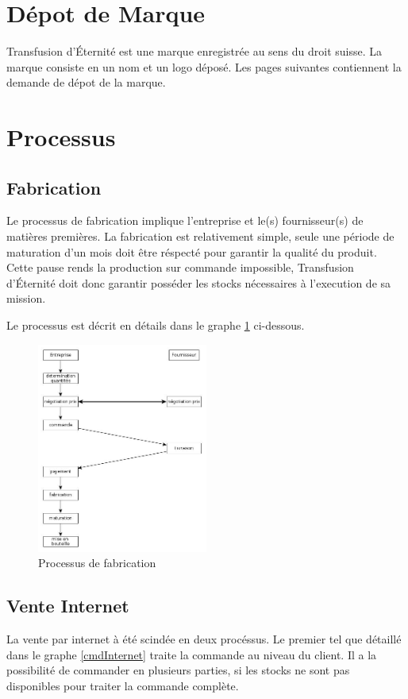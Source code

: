 \documentclass[10pt,a4paper]{article}
\newcommand{\tde}{Transfusion d'Éternité}
\begin{document}

\section{Dépot de Marque}
\tde{} est une marque enregistrée au sens du droit suisse.
La marque consiste en un nom et un logo déposé.
Les pages suivantes contiennent la demande de dépot de la marque.


\section{Processus}

\subsection{Fabrication}
Le processus de fabrication implique l'entreprise et le(s) fournisseur(s) de matières premières.
La fabrication est relativement simple, seule une période de maturation d'un mois doit être réspecté pour garantir la qualité du produit.
Cette pause rends la production sur commande impossible, \tde{} doit donc garantir posséder les stocks nécessaires à l'execution de sa mission.

Le processus est décrit en détails dans le graphe \ref{prod} ci-dessous.

\begin{figure}[h!]
\centering
\includegraphics[width=0.5\textwidth]{../flowchart/prod.jpg}
\caption{Processus de fabrication}
\label{prod}
\end{figure}
\subsection{Vente Internet}
La vente par internet à été scindée en deux procéssus.
Le premier tel que détaillé dans le graphe \ref{cmdInternet} traite la commande au niveau du client.
Il a la possibilité de commander en plusieurs parties, si les stocks ne sont pas disponibles pour traiter la commande complète.
\end{document}
